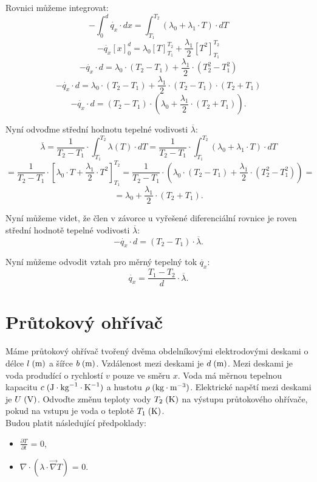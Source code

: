 \documentclass{article}
\begin{document}
Rovnici můžeme integrovat:
$$
    - \int_{0}^{d} \dot{q_x} \cdot dx = \int_{T_1}^{T_2} \left( \lambda_0 + \lambda_1 \cdot T \right) \cdot dT
$$
$$
    - \dot{q_x} \left[ x \right]_{0}^{d} = \lambda_0 \left[ T \right]_{T_1}^{T_2} + \frac{\lambda_1}{2} \left[ T^2 \right]_{T_1}^{T_2}
$$
$$
    - \dot{q_x} \cdot d = \lambda_0 \cdot (T_2 - T_1) + \frac{\lambda_1}{2} \cdot (T_2^2 - T_1^2)
$$
$$
    - \dot{q_x} \cdot d = \lambda_0 \cdot (T_2 - T_1) + \frac{\lambda_1}{2} \cdot (T_2 - T_1) \cdot (T_2 + T_1)
$$
$$
    - \dot{q_x} \cdot d = (T_2 - T_1) \cdot \left( \lambda_0 + \frac{\lambda_1}{2} \cdot (T_2 + T_1) \right).
$$

Nyní odvoďme střední hodnotu tepelné vodivosti $\overline{\lambda}$:
$$
    \overline{\lambda} = \frac{1}{T_2 - T_1} \cdot \int_{T_1}^{T_2} \lambda (T) \cdot dT = \frac{1}{T_2 - T_1} \cdot \int_{T_1}^{T_2} \left( \lambda_0 + \lambda_1 \cdot T \right) \cdot dT
$$
$$
    = \frac{1}{T_2 - T_1} \cdot \left[ \lambda_0 \cdot T + \frac{\lambda_1}{2} \cdot T^2 \right]_{T_1}^{T_2} = \frac{1}{T_2 - T_1} \cdot \left( \lambda_0 \cdot (T_2 - T_1) + \frac{\lambda_1}{2} \cdot (T_2^2 - T_1^2) \right) =
$$
$$
    = \lambda_0 + \frac{\lambda_1}{2} \cdot (T_2 + T_1).
$$

Nyní můžeme videt, že člen v závorce u vyřešené diferenciální rovnice je roven střední hodnotě tepelné vodivosti $\overline{\lambda}$:
$$
    - \dot{q_x} \cdot d = (T_2 - T_1) \cdot \overline{\lambda}.
$$

Nyní můžeme odvodit vztah pro měrný tepelný tok $\dot{q_x}$:
$$
    \dot{q_x} = \frac{T_1 - T_2}{d} \cdot \overline{\lambda}.
$$

\newpage




\section{ Průtokový ohřívač \spicy \spicy \spicy \spicy}
Máme průtokový ohřívač tvořený dvěma obdelníkovými elektrodovými deskami o délce $l \; (\textrm{m})$ a šířce $b \; (\textrm{m})$. Vzdálenost mezi deskami je $d \; (\textrm{m})$. Mezi deskami je voda produdící o rychlostí $v$ pouze ve směru $x$. Voda má měrnou tepelnou kapacitu $c \; (\textrm{J} \cdot \textrm{kg}^{-1} \cdot \textrm{K}^{-1})$ a hustotu $\rho \; (\textrm{kg} \cdot \textrm{m}^{-3})$. Elektrické napětí mezi deskami je $U \; (\textrm{V})$. Odvoďte změnu teploty vody $T_2 \; (\textrm{K})$ na výstupu průtokového ohřívače, pokud na vstupu je voda o teplotě $T_1 \; (\textrm{K})$.\\

Budou platit následující předpoklady:
\begin{itemize}
    \item $\frac{\partial T}{\partial t}$ = 0,
    \item $\nabla \cdot (\lambda \cdot \vec{\nabla} T)$ = 0.
\end{itemize}
\end{document}
